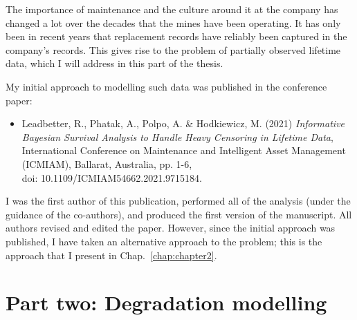 \documentclass[apa,colorlinks,emptypage]{curtinThesis}
\begin{document}
The importance of maintenance and the culture around it at the company has changed a lot over the decades that the mines have been operating. It has only been in recent years that replacement records have reliably been captured in the company's records. This gives rise to the problem of partially observed lifetime data, which I will address in this part of the thesis.

My initial approach to modelling such data was published in the conference paper:
\begin{itemize}
  \item Leadbetter, R., Phatak, A., Polpo, A. \& Hodkiewicz, M. (2021) \textit{Informative Bayesian Survival Analysis to Handle Heavy Censoring in Lifetime Data}, International Conference on Maintenance and Intelligent Asset Management (ICMIAM), Ballarat, Australia, pp. 1-6,\\ doi: 10.1109/ICMIAM54662.2021.9715184.
\end{itemize}
I was the first author of this publication, performed all of the analysis (under the guidance of the co-authors), and produced the first version of the manuscript. All authors revised and edited the paper. However, since the initial approach was published, I have taken an alternative approach to the problem; this is the approach that I present in Chap.~\ref{chap:chapter2}.




\part{Part two: Degradation modelling}\label{part:two}
\end{document}

